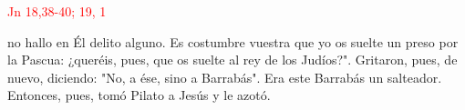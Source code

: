 \hfill\textcolor{red}{Jn 18,38-40; 19, 1}

no hallo en Él delito alguno. Es costumbre vuestra que yo os suelte un preso por la Pascua: ¿queréis, 
pues, que os suelte al rey de los Judíos?". Gritaron, pues, de nuevo, diciendo: "No, a ése, sino a Barrabás". 
Era este Barrabás un salteador. Entonces, pues, tomó Pilato a Jesús y le azotó. 